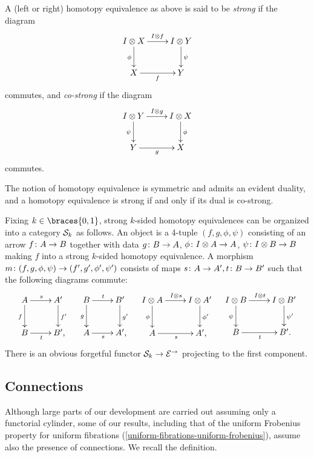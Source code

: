 \documentclass[reqno,10pt,a4paper,oneside,draft]{amsart}
\begin{document}
\begin{definition} \label{def:strhe}
A (left or right) homotopy equivalence as above is said to be \emph{strong} if the diagram
\[
\xymatrix{
  \interval \otimes X
  \ar[r]^{\interval \otimes f}
  \ar[d]_{\phi}
&
  \interval \otimes Y
  \ar[d]^{\psi}
\\
  X
  \ar[r]_{f}
&
  Y
}
\]
commutes, and \emph{co-strong} if the diagram
\[
\xymatrix{
  \interval \otimes Y
  \ar[r]^{\interval \otimes g}
  \ar[d]_{\psi}
&
  \interval \otimes X
  \ar[d]^{\phi}
\\
  Y
  \ar[r]_{g}
&
  X
}
\]
commutes.
\end{definition}

The notion of homotopy equivalence is symmetric and admits an evident duality, and a homotopy equivalence is strong if and only if its dual is co-strong.

Fixing $k \in \braces{0, 1}$, strong $k$-sided homotopy equivalences can be organized into a category $\cal{S}_k$ as follows.
An object is a 4-tuple $(f, g, \phi, \psi)$ consisting of an arrow $f \co A \to B$ together with data $g \co B \to A$, $\phi \co \interval \otimes A \to A$, $\psi \co \interval \otimes B \to B$ making $f$ into a strong $k$-sided homotopy equivalence.
A morphism $m \co (f, g, \phi, \psi) \to (f', g', \phi', \psi')$ consists of maps $s \co A \to A', t \co B \to B'$ such that the following diagrams commute:
\begin{align*}
\xymatrix{
  A
  \ar[r]^{s}
  \ar[d]_{f}
&
  A'
  \ar[d]^{f'}
\\
  B
  \ar[r]_{t}
&
  B'
\rlap{,}}
&&
\xymatrix{
  B
  \ar[r]^{t}
  \ar[d]_{g}
&
  B'
  \ar[d]^{g'}
\\
  A
  \ar[r]_{s}
&
  A'
\rlap{,}}
&&
\xymatrix{
  \interval \otimes A
  \ar[d]_{\phi}
  \ar[r]^{\interval \otimes s}
&
  I \otimes A'
  \ar[d]^{\phi'}
\\
  A
  \ar[r]_{s}
&
  A'
\rlap{,}}
&&
\xymatrix{
  \interval \otimes B
  \ar[d]_{\psi}
  \ar[r]^{\interval \otimes t}
&
  I \otimes B'
  \ar[d]^{\psi'}
\\
  B
  \ar[r]_{t}
&
  B'
\rlap{.}}
\end{align*}
There is an obvious forgetful functor $\cal{S}_k \to \catE^\to$ projecting to the first component.

\subsection*{Connections}

Although large parts of our development are carried out assuming only a functorial cylinder, some of our results, including that of the uniform Frobenius property for uniform fibrations (\cref{uniform-fibrations-uniform-frobenius}), assume also the presence of connections.
We recall the definition.
\end{document}
